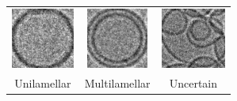 \documentclass{beamer}
\begin{document}
\begin{frame}
\begin{columns}
\begin{figure}[H]
\begin{tabular}{ccc}
	\includegraphics[height=2cm, keepaspectratio]{problem_description/lamellarity/uni3} & \includegraphics[height=2cm, keepaspectratio]{problem_description/lamellarity/multi3} & \includegraphics[height=2cm, keepaspectratio]{problem_description/lamellarity/uncertain3} \\
Unilamellar & Multilamellar & Uncertain \\[6pt]
\end{tabular}
\end{figure}
\end{columns}

\end{frame}
\end{document}
